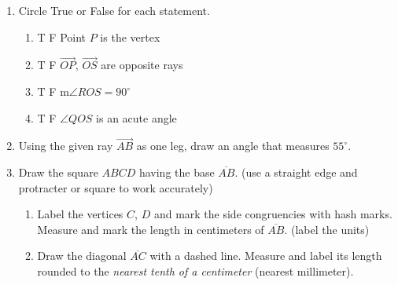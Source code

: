 \begin{enumerate}
\item Circle True or False for each statement.
\begin{multicols*}{2}
  \begin{enumerate}
    \item T \quad F \quad Point $P$ is the vertex
    \item T \quad F \quad $\overrightarrow{OP}$, $\overrightarrow{OS}$ are opposite rays
    \item T \quad F \quad m$\angle ROS = 90^\circ$
    \item T \quad F \quad $\angle QOS$ is an acute angle
  \end{enumerate}
\end{multicols*}

\newpage
\item Using the given ray $\overrightarrow{AB}$ as one leg, draw an angle that measures $55^\circ$. \par \vspace{5cm} \hspace{3cm}

\item Draw the square $ABCD$ having the base $\overline{AB}$. (use a straight edge and protracter or square to work accurately)
\begin{enumerate}
  \item Label the vertices $C$, $D$ and mark the side congruencies with hash marks. Measure and mark the length in centimeters of $\overline{AB}$. (label the units)
  \item Draw the diagonal $\overline{AC}$ with a dashed line. Measure and label its length rounded to the \emph{nearest tenth of a centimeter} (nearest millimeter).
\end{enumerate}
\vspace{5cm}
\begin{center}
\end{center}


\end{enumerate}
